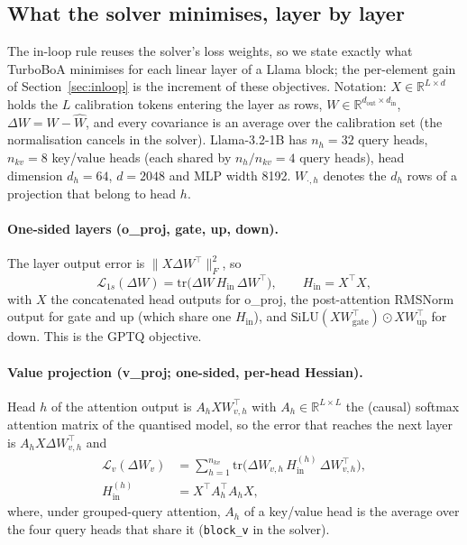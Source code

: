 \documentclass{article}
\newcommand{\tr}{\mathrm{tr}}
\newcommand{\Hin}{H_{\mathrm{in}}}
\begin{document}
\subsection{What the solver minimises, layer by layer}
\label{sec:objectives}

The in-loop rule reuses the solver's loss weights, so we state exactly
what TurboBoA \citep{kim2025boa} minimises for each linear layer of a
Llama block; the per-element gain of Section~\ref{sec:inloop} is the
increment of these objectives. Notation: $X \in \mathbb{R}^{L\times d}$
holds the $L$ calibration tokens entering the layer as rows, $W \in
\mathbb{R}^{d_{\mathrm{out}}\times d_{\mathrm{in}}}$, $\Delta W = W -
\hat W$, and every covariance is an average over the calibration set (the
normalisation cancels in the solver). Llama-3.2-1B has $n_h = 32$ query
heads, $n_{kv} = 8$ key/value heads (each shared by $n_h/n_{kv} = 4$
query heads), head dimension $d_h = 64$, $d = 2048$ and MLP width 8192.
$W_{\cdot,h}$ denotes the $d_h$ rows of a projection that belong to head
$h$.

\paragraph{One-sided layers (o\_proj, gate, up, down).} The layer output
error is $\|X\Delta W^\top\|_F^2$, so
\begin{equation}
  \mathcal{L}_{1s}(\Delta W) = \tr\big(\Delta W\,\Hin\,\Delta W^\top\big),
  \qquad \Hin = X^\top X,
  \label{eq:onesided}
\end{equation}
with $X$ the concatenated head outputs for o\_proj, the post-attention
RMSNorm output for gate and up (which share one $\Hin$), and
$\mathrm{SiLU}(XW_{\mathrm{gate}}^\top)\odot XW_{\mathrm{up}}^\top$ for
down. This is the GPTQ objective.

\paragraph{Value projection (v\_proj; one-sided, per-head Hessian).}
Head $h$ of the attention output is $A_h X W_{v,h}^\top$ with $A_h \in
\mathbb{R}^{L\times L}$ the (causal) softmax attention matrix of the
quantised model, so the error that reaches the next layer is $A_h X\Delta
W_{v,h}^\top$ and
\begin{equation}
\begin{aligned}
  \mathcal{L}_v(\Delta W_v) &= \sum_{h=1}^{n_{kv}}
  \tr\big(\Delta W_{v,h}\,\Hin^{(h)}\,\Delta W_{v,h}^\top\big),\\
  \Hin^{(h)} &= X^\top A_h^\top A_h X,
\end{aligned}
\label{eq:value}
\end{equation}
where, under grouped-query attention, $A_h$ of a key/value head is the
average over the four query heads that share it (\texttt{block\_v} in
the solver).
\end{document}
